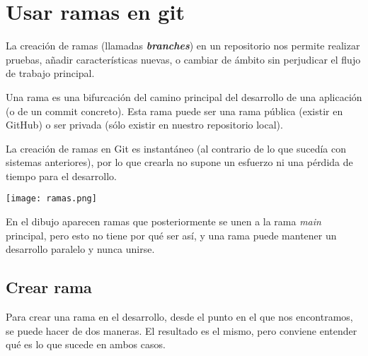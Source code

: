 \chapter{Usar ramas en git}

La creación de ramas (llamadas \textbf{\textit{branches}}) en un repositorio nos permite realizar pruebas, añadir características nuevas, o cambiar de ámbito sin perjudicar el flujo de trabajo principal.

Una rama es una bifurcación del camino principal del desarrollo de una aplicación (o de un commit concreto). Esta rama puede ser una rama pública (existir en GitHub) o ser privada (sólo existir en nuestro repositorio local).

La creación de ramas en Git es instantáneo (al contrario de lo que sucedía con sistemas anteriores), por lo que crearla no supone un esfuerzo ni una pérdida de tiempo para el desarrollo.

\begin{center}
    \texttt{[image: ramas.png]}
\end{center}

En el dibujo aparecen ramas que posteriormente se unen a la rama \textit{main} principal, pero esto no tiene por qué ser así, y una rama puede mantener un desarrollo paralelo y nunca unirse.

\section{Crear rama}
Para crear una rama en el desarrollo, desde el punto en el que nos encontramos, se puede hacer de dos maneras. El resultado es el mismo, pero conviene entender qué es lo que sucede en ambos casos.

